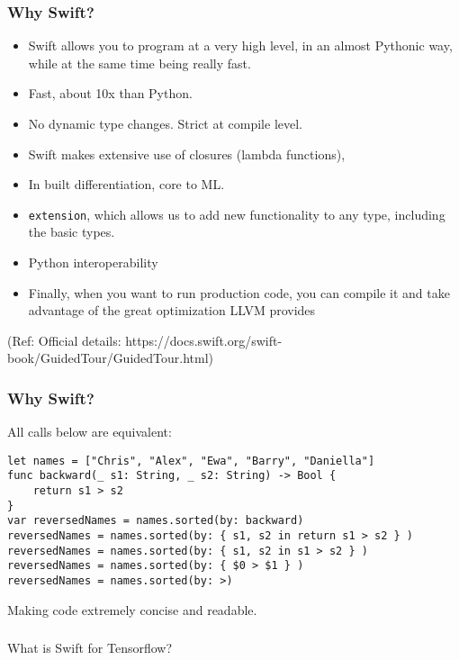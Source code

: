 \begin{frame}[fragile] \frametitle{Why Swift?}

\begin{itemize}
\item Swift allows you to program at a very high level, in an almost Pythonic way, while at the same time being really fast.
\item Fast, about 10x than Python.
\item No dynamic type changes. Strict at compile level.
\item Swift makes extensive use of closures (lambda functions),
\item In built differentiation, core to ML.
\item \lstinline|extension|, which allows us to add new functionality to any type, including the basic types.
\item Python interoperability
\item Finally, when you want to run production code, you can compile it and take advantage of the great optimization LLVM provides
\end{itemize}


{\tiny (Ref: Official details: https://docs.swift.org/swift-book/GuidedTour/GuidedTour.html)}

\end{frame}

\begin{frame}[fragile] \frametitle{Why Swift?}

All calls below are equivalent:

\begin{lstlisting}[basicstyle=\scriptsize]
let names = ["Chris", "Alex", "Ewa", "Barry", "Daniella"]
func backward(_ s1: String, _ s2: String) -> Bool {
    return s1 > s2
}
var reversedNames = names.sorted(by: backward)
reversedNames = names.sorted(by: { s1, s2 in return s1 > s2 } )
reversedNames = names.sorted(by: { s1, s2 in s1 > s2 } )
reversedNames = names.sorted(by: { $0 > $1 } )
reversedNames = names.sorted(by: >)
\end{lstlisting}

Making code extremely concise and readable.


\end{frame}

\begin{frame}[fragile]\frametitle{}
\begin{center}
{\Large What is Swift for Tensorflow?}
\end{center}
\end{frame}

